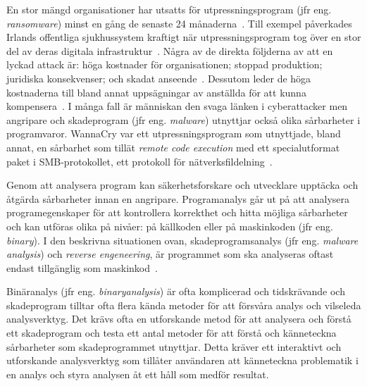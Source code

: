 En stor mängd organisationer har utsatts för utpressningsprogram (jfr eng.
\emph{ransomware}) minst en gång de senaste 24 månaderna~\cite{cyberreason2021,
    cyberreason2022}. Till exempel påverkades Irlands offentliga sjukhussystem
kraftigt när utpressningsprogram tog över en stor del av deras digitala
infrastruktur~\cite{hse_report, gallagher2023}.  Några av de direkta följderna
av att en lyckad attack är: höga kostnader för organisationen; stoppad
produktion; juridiska konsekvenser; och skadat
anseende~\cite{cyberreason2021, cyberreason2022}. Dessutom leder de höga
kostnaderna till bland annat uppsägningar av anställda för att kunna
kompensera~\cite{cyberreason2021, cyberreason2022}. I många fall är människan
den svaga länken i cyberattacker men angripare och skadeprogram (jfr eng.
\emph{malware}) utnyttjar också olika sårbarheter i programvaror. WannaCry var
ett utpressningsprogram som utnyttjade, bland annat, en sårbarhet som tillät
\emph{remote code execution} med ett specialutformat paket i SMB-protokollet,
ett protokoll för nätverksfildelning~\cite{alraddadicomprehensive}.

Genom att analysera program kan säkerhetsforskare och utvecklare upptäcka och
åtgärda sårbarheter innan en angripare. Programanalys går ut på att analysera
programegenskaper för att kontrollera korrekthet och hitta möjliga sårbarheter
och kan utföras olika på nivåer: på källkoden eller på maskinkoden (jfr eng.
\emph{binary}). I den beskrivna situationen ovan, skadeprogramsanalys (jfr eng.
\emph{malware analysis}) och \emph{reverse engeneering}, är programmet som ska
analyseras oftast endast tillgänglig som maskinkod~\cite{andriesse2018}.

Binäranalys (jfr eng. \emph{binaryanalysis}) är ofta komplicerad och
tidskrävande och skadeprogram tilltar ofta flera kända metoder för att försvåra
analys och vilseleda analysverktyg. Det krävs ofta en utforskande metod för att
analysera och förstå ett skadeprogram och testa ett antal metoder för att förstå
och känneteckna sårbarheter som skadeprogrammet utnyttjar. Detta kräver ett
interaktivt och utforskande analysverktyg som tillåter användaren att
känneteckna problematik i en analys och styra analysen åt ett håll som medför
resultat.

